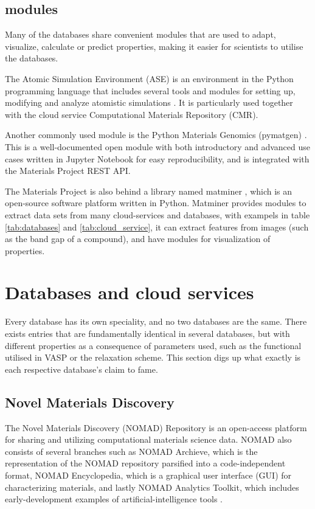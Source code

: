 


\subsection{modules}
Many of the databases share convenient modules that are used to adapt, visualize, calculate or predict properties, making it easier for scientists to utilise the databases.

The Atomic Simulation Environment (ASE) is an environment in the Python programming language that includes several tools and modules for setting up, modifying and analyze atomistic simulations \cite{Larsen2017}. It is particularly used together with the cloud service Computational Materials Repository (CMR).

Another commonly used module is the Python Materials Genomics (pymatgen) \cite{Ong2013}. This is a well-documented open module with both introductory and advanced use cases written in Jupyter Notebook for easy reproducibility, and is integrated with the Materials Project REST API.

The Materials Project is also behind a library named matminer \cite{Ward2018}, which is an open-source software platform written in Python. Matminer provides modules to extract data sets from many cloud-services and databases, with exampels in table \ref{tab:databases} and \ref{tab:cloud_service}, it can extract features from images (such as the band gap of a compound), and have modules for visualization of properties.

\section{Databases and cloud services}

Every database has its own speciality, and no two databases are the same. There exists entries that are fundamentally identical in several databases, but with different properties as a consequence of parameters used, such as the functional utilised in VASP or the relaxation scheme. This section digs up what exactly is each respective database's claim to fame.

\subsection{Novel Materials Discovery}

The Novel Materials Discovery (NOMAD) \cite{Draxl2019} Repository is an open-access platform for sharing and utilizing computational materials science data. NOMAD also consists of several branches such as NOMAD Archieve, which is the representation of the NOMAD repository parsified into a code-independent format, NOMAD Encyclopedia, which is a graphical user interface (GUI) for characterizing materials, and lastly NOMAD Analytics Toolkit, which includes early-development examples of artificial-intelligence tools \cite{Draxl2019}.

